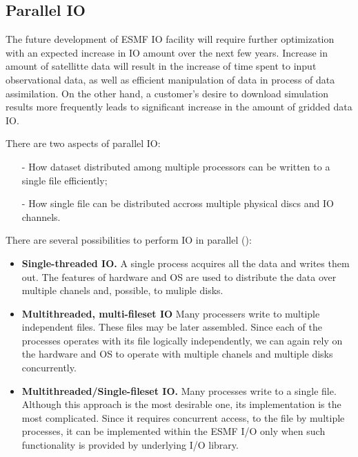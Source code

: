 \subsection{Parallel IO}

The future development of ESMF IO facility will require further
optimization with an expected increase in IO amount over the next few
years. Increase in amount of satellitte data will result in the
increase of time spent to input observational data, as well as
efficient manipulation of data in process of data assimilation. On the
other hand, a customer's desire to download simulation results more 
frequently leads to significant increase in the amount of gridded data IO.

There are two aspects of  parallel IO:

\begin{itemize}
\item[-] How dataset distributed among multiple processors can be
written to a single file efficiently;

\item[-] How single file can be distributed accross multiple physical
discs and IO channels.
\end{itemize}
 
There are several possibilities to perform IO in parallel (\cite{MPI-2}):
\begin{itemize}
\item {\bf Single-threaded IO.} A single process acquires all the data and
writes them out. The features of hardware and OS are used to distribute the 
data over multiple chanels and, possible, to muliple disks.

\item {\bf Multithreaded, multi-fileset IO} Many processers write to
multiple independent files. These files may be later assembled. Since each of 
the processes operates with its file logically independently, we can again 
rely on the hardware and OS to operate with multiple chanels and multiple 
disks concurrently. 
 
\item {\bf Multithreaded/Single-fileset IO.} Many processes write to a
single file. Although this approach is the most desirable one, its 
implementation is the most complicated. Since it requires concurrent access, 
to the file by multiple processes, it can be implemented within the ESMF I/O 
only when such functionality is provided by underlying I/O library. 
\end{itemize}

